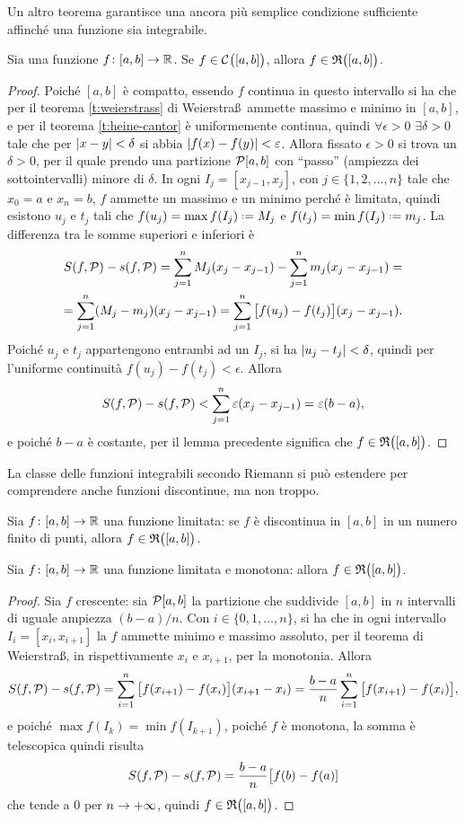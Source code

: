 Un altro teorema garantisce una ancora più semplice condizione sufficiente affinché una funzione sia integrabile.
\begin{teorema} \label{t:continua-integrabile}
Sia una funzione $f\colon[a,b]\to\mathbb{R}$. Se $f\in\mathcal{C}^{{}}\big([a,b]\big)$, allora $f\in\mathfrak{R}\big([a,b]\big)$.
\end{teorema}
\begin{proof}
Poiché $[a,b]$ è compatto, essendo $f$ continua in questo intervallo si ha che per il teorema \ref{t:weierstrass} di Weierstra\ss\ ammette massimo e minimo in $[a,b]$, e per il teorema \ref{t:heine-cantor} è uniformemente continua, quindi $\forall\epsilon>0$ $\exists\delta>0$ tale che per $\left|{x-y}\right|<\delta$ si abbia $\left|{f(x)-f(y)}\right|<\varepsilon$.
Allora fissato $\epsilon>0$ si trova un $\delta>0$, per il quale prendo una partizione $\mathcal{P}[a,b]$ con ``passo'' (ampiezza dei sottointervalli) minore di $\delta$. In ogni $I_j=[x_{j-1},x_j]$, con $j\in\{1,2,\dots,n\}$ tale che $x_0=a$ e $x_n=b$, $f$ ammette un massimo e un minimo perché è limitata, quindi esistono $u_j$ e $t_j$ tali che $f(u_j)=\max f(I_j)\defeq M_j$ e $f(t_j)=\min f(I_j)\defeq m_j$. La differenza tra le somme superiori e inferiori è
\begin{multline}
S(f,\mathcal{P})-s(f,\mathcal{P})=\sum_{j=1}^nM_j(x_j-x_{j-1})-\sum_{j=1}^nm_j(x_j-x_{j-1})=\\
=\sum_{j=1}^n(M_j-m_j)(x_j-x_{j-1})=\sum_{j=1}^n\big[f(u_j)-f(t_j)\big](x_j-x_{j-1}).
\end{multline}
Poiché $u_j$ e $t_j$ appartengono entrambi ad un $I_j$, si ha $\left|{u_j-t_j}\right|<\delta$, quindi per l'uniforme continuità $f(u_j)-f(t_j)<\epsilon$. Allora
\[
S(f,\mathcal{P})-s(f,\mathcal{P})<\sum_{j=1}^n\varepsilon(x_j-x_{j-1})=\varepsilon(b-a),
\]
e poiché $b-a$ è costante, per il lemma precedente significa che $f\in\mathfrak{R}\big([a,b]\big)$.
\end{proof}
La classe delle funzioni integrabili secondo Riemann si può estendere per comprendere anche funzioni discontinue, ma non troppo.
\begin{osservazione}
Sia $f\colon[a,b]\to\mathbb{R}$ una funzione limitata: se $f$ è discontinua in $[a,b]$ in un numero finito di punti, allora $f\in\mathfrak{R}\big([a,b]\big)$.
\end{osservazione}
\begin{teorema}
Sia $f\colon[a,b]\to\mathbb{R}$ una funzione limitata e monotona: allora $f\in\mathfrak{R}\big([a,b]\big)$.
\end{teorema}
\begin{proof}
Sia $f$ crescente: sia $\mathcal{P}[a,b]$ la partizione che suddivide $[a,b]$ in $n$ intervalli di uguale ampiezza $(b-a)/n$. Con $i\in\{0,1,\dots,n\}$, si ha che in ogni intervallo $I_i=[x_i,x_{i+1}]$ la $f$ ammette minimo e massimo assoluto, per il teorema di Weierstra\ss, in rispettivamente $x_i$ e $x_{i+1}$, per la monotonia. Allora
\[
S(f,\mathcal{P})-s(f,\mathcal{P})=\sum_{i=1}^n\big[f(x_{i+1})-f(x_i)\big](x_{i+1}-x_i)=\frac{b-a}{n}\sum_{i=1}^n\big[f(x_{i+1})-f(x_i)\big],
\]
e poiché $\max f(I_k)=\min f(I_{k+1})$, poiché $f$ è monotona, la somma è telescopica quindi risulta
\[
S(f,\mathcal{P})-s(f,\mathcal{P})=\frac{b-a}{n}\big[f(b)-f(a)]
\]
che tende a 0 per $n\to+\infty$, quindi $f\in\mathfrak{R}\big([a,b]\big)$.
\end{proof}

